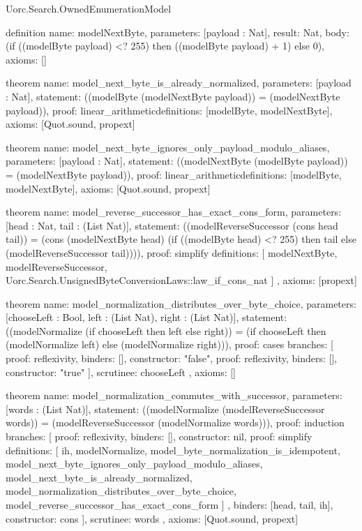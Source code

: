 \begin{lexlean}{Uorc.Search.OwnedEnumerationModel}
\begin{semanticmodule}
definition{
  name: modelNextByte,
  parameters: [payload : Nat],
  result: Nat,
  body: (if ((modelByte payload) <? 255) then ((modelByte payload) + 1) else 0),
  axioms: []
}

theorem{
  name: model_next_byte_is_already_normalized,
  parameters: [payload : Nat],
  statement: ((modelByte (modelNextByte payload)) = (modelNextByte payload)),
  proof: linear_arithmetic{definitions: [modelByte, modelNextByte]},
  axioms: [Quot.sound, propext]
}

theorem{
  name: model_next_byte_ignores_only_payload_modulo_aliases,
  parameters: [payload : Nat],
  statement: ((modelNextByte (modelByte payload)) = (modelNextByte payload)),
  proof: linear_arithmetic{definitions: [modelByte, modelNextByte]},
  axioms: [Quot.sound, propext]
}

theorem{
  name: model_reverse_successor_has_exact_cons_form,
  parameters: [head : Nat, tail : (List Nat)],
  statement: ((modelReverseSuccessor (cons head tail)) = (cons (modelNextByte head) (if ((modelByte head) <? 255) then tail else (modelReverseSuccessor tail)))),
  proof: simplify{
    definitions: [
      modelNextByte,
      modelReverseSuccessor,
      Uorc.Search.UnsignedByteConversionLaws::law_if_cons_nat
    ]
  },
  axioms: [propext]
}

theorem{
  name: model_normalization_distributes_over_byte_choice,
  parameters: [chooseLeft : Bool, left : (List Nat), right : (List Nat)],
  statement: ((modelNormalize (if chooseLeft then left else right)) = (if chooseLeft then (modelNormalize left) else (modelNormalize right))),
  proof: cases{
    branches: [
      {proof: reflexivity{}, binders: [], constructor: "false"},
      {proof: reflexivity{}, binders: [], constructor: "true"}
    ],
    scrutinee: chooseLeft
  },
  axioms: []
}

theorem{
  name: model_normalization_commutes_with_successor,
  parameters: [words : (List Nat)],
  statement: ((modelNormalize (modelReverseSuccessor words)) = (modelReverseSuccessor (modelNormalize words))),
  proof: induction{
    branches: [
      {proof: reflexivity{}, binders: [], constructor: nil},
      {
        proof: simplify{
          definitions: [
            ih,
            modelNormalize,
            model_byte_normalization_is_idempotent,
            model_next_byte_ignores_only_payload_modulo_aliases,
            model_next_byte_is_already_normalized,
            model_normalization_distributes_over_byte_choice,
            model_reverse_successor_has_exact_cons_form
          ]
        },
        binders: [head, tail, ih],
        constructor: cons
      }
    ],
    scrutinee: words
  },
  axioms: [Quot.sound, propext]
}


\end{semanticmodule}
\end{lexlean}
